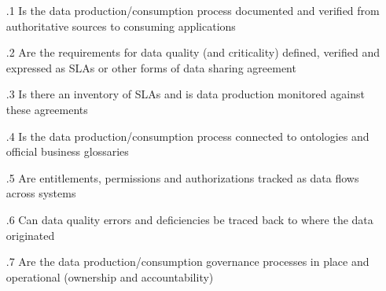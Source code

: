 \begin{itemize}[leftmargin=.5in]

  \item [\thesection.1] Is the data production/consumption process documented and verified from authoritative sources to consuming applications
  \item [\thesection.2] Are the requirements for data quality (and criticality) defined, verified and expressed as SLAs or other forms of data sharing agreement
  \item [\thesection.3] Is there an inventory of SLAs and is data production monitored against these agreements
  \item [\thesection.4] Is the data production/consumption process connected to ontologies and official business glossaries
  \item [\thesection.5] Are entitlements, permissions and authorizations tracked as data flows across systems
  \item [\thesection.6] Can data quality errors and deficiencies be traced back to where the data originated
  \item [\thesection.7] Are the data production/consumption governance processes in place and operational (ownership and accountability)

\end{itemize}
